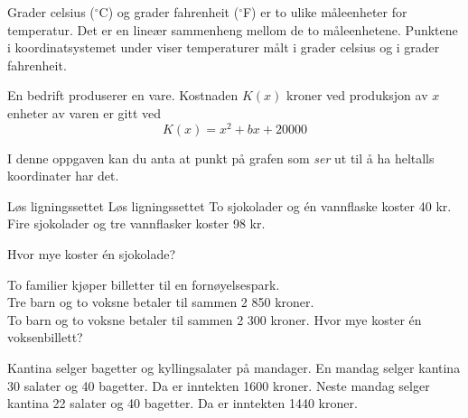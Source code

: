 Grader celsius ($^\circ$C) og grader fahrenheit ($^\circ$F) er to ulike måleenheter for temperatur. Det er en lineær sammenheng mellom de to måleenhetene. Punktene i
koordinatsystemet under viser temperaturer målt i grader celsius og i grader
fahrenheit.

En bedrift produserer en vare. Kostnaden $K(x)$ kroner ved produksjon av $x$ enheter av varen er gitt ved
\[
K(x) = x^2 + bx + 20000
\]

\newpage
{}
I denne oppgaven kan du anta at punkt på grafen som \textit{ser} ut til å ha heltalls koordinater har det.


Løs ligningssettet
Løs ligningssettet
\newpage
{}
To sjokolader og én vannflaske koster 40 kr.\\
Fire sjokolader og tre vannflasker koster 98 kr.\os

Hvor mye koster én sjokolade?

To familier kjøper billetter til en fornøyelsespark.\\
Tre barn og to voksne betaler til sammen 2 850 kroner.\\
To barn og to voksne betaler til sammen 2 300 kroner.\os
Hvor mye koster én voksenbillett?

Kantina selger bagetter og kyllingsalater på mandager. En mandag selger kantina 30 salater og 40 bagetter. Da er inntekten 1600 kroner.
Neste mandag selger kantina 22 salater og 40 bagetter. Da er inntekten 1440 kroner.\os

